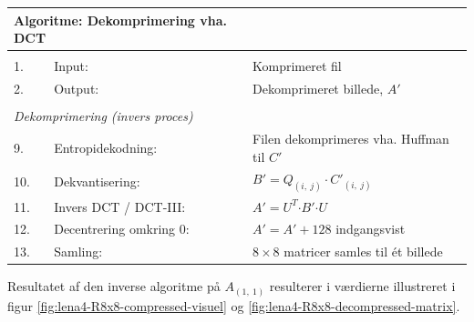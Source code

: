 \begin{table}[!h]
\centering
\begin{tabular}{lll}
\hline
\multicolumn{2}{l}{\textbf{Algoritme: Dekomprimering vha. DCT}}    &                                                                   \\ \hline
\\
\multicolumn{1}{|l}{1.}        & Input:                     & Komprimeret fil \\
\multicolumn{1}{|l}{2.}        & Output:                    & Dekomprimeret billede, $A'$                                           \\
                               &                            &                                                                   \\
\multicolumn{2}{|l}{\textit{Dekomprimering (invers proces)}} &                                                                   \\
\multicolumn{1}{|l}{9.}        & Entropidekodning:         & Filen dekomprimeres vha. Huffman til $C'$             \\
\multicolumn{1}{|l}{10.}        & Dekvantisering:            & $B' = Q_{(i,\ j)} \cdot C'_{(i,\ j)}$                                                 \\
\multicolumn{1}{|l}{11.}       & Invers DCT / DCT-III:      & $A' = U^T \boldsymbol{\cdot} B' \boldsymbol{\cdot} U$\\
\multicolumn{1}{|l}{12.}       & Decentrering omkring 0:      & $A' = A' + 128$ indgangsvist\\
\multicolumn{1}{|l}{13.}       & Samling:                   & $8 \times 8$ matricer samles til ét billede
\\  
\end{tabular}
\label{tb:Algoritme-Dekomprimering-DCT}
\end{table}
Resultatet af den inverse algoritme på $A_{(1,\ 1)}$ resulterer i værdierne illustreret i figur \ref{fig:lena4-R8x8-compressed-visuel} og \ref{fig:lena4-R8x8-decompressed-matrix}.
